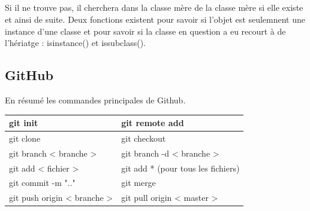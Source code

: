 \documentclass[a4paper, 12pt, twoside]{article}
\begin{document}
{{{\subparagraph{}{Si il ne trouve pas, il cherchera dans la classe mère de la classe mère si elle existe et ainsi de suite. Deux fonctions existent pour savoir si l'objet est seulemnent  une instance d'une classe et pour savoir si la classe en question a eu recourt à de l'hériatge : isinstance() et issubclass(). }

\subsection{GitHub}
En résumé les commandes principales de \textsf{Github}.
\begin{center}
\begin{tabular}{|l|l|}
\hline
git init & git remote add \\ \hline
git clone & git checkout \\ \hline
git branch < branche > &  git branch -d < branche > \\ \hline
git add < fichier > &  git add * (pour tous les fichiers) \\ \hline
git commit -m ".." &  git merge \\ \hline
git push origin < branche > & git pull origin < master >  \\ \hline
\end{tabular}
\end{center}
\newpage
}}}
\end{document}
